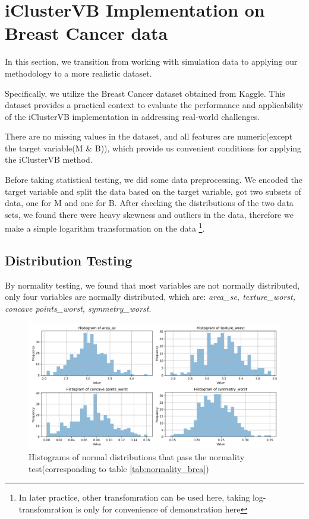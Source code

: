 \section{iClusterVB Implementation on Breast Cancer data}

In this section, we transition from working with simulation data to applying our
methodology to a more realistic dataset. 

Specifically, we utilize the Breast Cancer dataset obtained from Kaggle.
This dataset provides a practical context to evaluate the performance 
and applicability of the iClusterVB implementation in addressing real-world challenges.


There are no missing values in the dataset, and all features are numeric(except the target variable(M \& B)), which provide 
us convenient conditions for applying the iClusterVB method.

Before taking statistical testing, we did some data preprocessing. We encoded the target variable and split the data based on the 
target variable, got two subsets of data, one for M and one for B.  After checking the distributions of the two data sets,
we found there were heavy skewness and outliers in the data, therefore we make a simple logarithm transformation on the data
\footnote{In later practice, other transfomration can be used here, taking log-transfomration is only for convenience of demonstration
here}.

\subsection{Distribution Testing}
By normality testing, we found that most variables are not normally distributed,
only four variables are normally distributed, which are: \textit{area\_se, texture\_worst, concave points\_worst, symmetry\_worst}.

\begin{figure}[!h]
    \centering
    \includegraphics[width=0.9\linewidth]{../results/breast_cancer_normal_distributions.png}
    \caption{Histograms of normal distributions that pass the normality test(corresponding to table \ref{tab:normality_brca})}
    \label{fig:normal_histograms_brca}
\end{figure}

